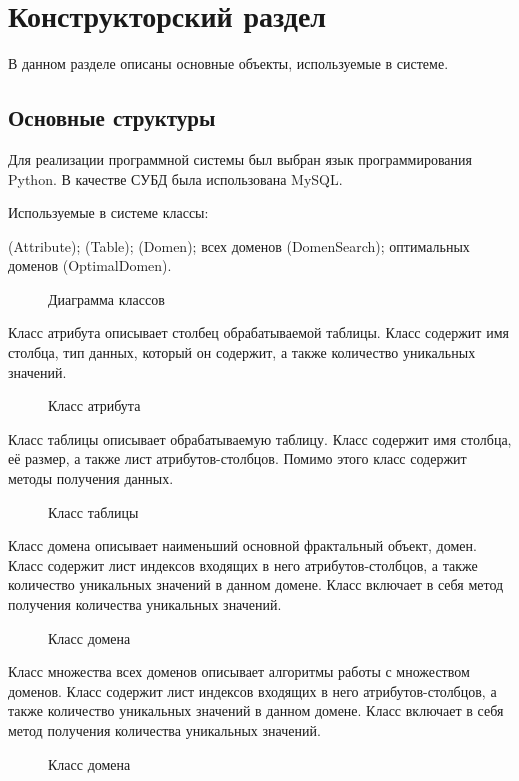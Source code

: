 \section{Конструкторский раздел }

В данном разделе описаны основные объекты, используемые в системе.

\subsection{Основные структуры}

Для реализации программной системы был выбран язык программирования Python.  В качестве СУБД была использована MySQL. 

Используемые в системе классы: 
\begin{enumerate}
 (Attribute);
 (Table);
 (Domen);
 всех доменов (DomenSearch);
 оптимальных доменов (OptimalDomen).
\end{enumerate}

\begin{figure}[H]
\caption{Диаграмма классов}
\end{figure}

Класс атрибута описывает столбец обрабатываемой таблицы. Класс содержит имя столбца, тип данных, который он содержит, а также количество уникальных значений. 
\\

\begin{figure}[H]

\caption{Класс атрибута}
\end{figure} 
 

Класс таблицы описывает обрабатываемую таблицу. Класс содержит имя столбца, её размер, а также лист атрибутов-столбцов. Помимо этого класс содержит методы получения данных.
\\

\begin{figure}[H]

\caption{Класс таблицы}
\end{figure} 

Класс домена описывает наименьший основной фрактальный объект, домен. Класс содержит лист индексов входящих в него атрибутов-столбцов, а также количество уникальных значений в данном домене. Класс включает в себя метод получения количества уникальных значений.
\\

\begin{figure}[H]

\caption{Класс домена}
\end{figure} 
 
Класс множества всех доменов описывает алгоритмы работы с множеством доменов. Класс содержит лист индексов входящих в него атрибутов-столбцов, а также количество уникальных значений в данном домене. Класс включает в себя метод получения количества уникальных значений.

\begin{figure}[H]

\caption{Класс домена}
\end{figure} 
  

\pagebreak